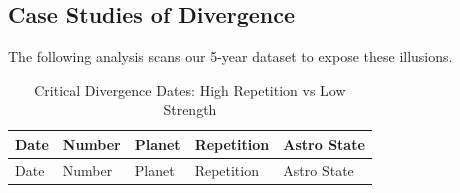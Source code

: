\documentclass[
  american,
  11pt,
  oneside,
  openany]{article}
\begin{document}
\subsection{Case Studies of
Divergence}\label{case-studies-of-divergence}

The following analysis scans our 5-year dataset to expose these
illusions.

\label{divergence-analysis}
\begin{longtable}[]{@{}
  >{\raggedright\arraybackslash}p{}
  >{\raggedleft\arraybackslash}p{}
  >{\raggedright\arraybackslash}p{}
  >{\raggedright\arraybackslash}p{}
  >{\raggedright\arraybackslash}p{}@{}}
\caption{Critical Divergence Dates: High Repetition vs Low
Strength}\tabularnewline
\toprule\noalign{}
\begin{minipage}[b]{\linewidth}\raggedright
Date
\end{minipage} & \begin{minipage}[b]{\linewidth}\raggedleft
Number
\end{minipage} & \begin{minipage}[b]{\linewidth}\raggedright
Planet
\end{minipage} & \begin{minipage}[b]{\linewidth}\raggedright
Repetition
\end{minipage} & \begin{minipage}[b]{\linewidth}\raggedright
Astro State
\end{minipage} \\
\midrule\noalign{}
\endfirsthead
\toprule\noalign{}
\begin{minipage}[b]{\linewidth}\raggedright
Date
\end{minipage} & \begin{minipage}[b]{\linewidth}\raggedleft
Number
\end{minipage} & \begin{minipage}[b]{\linewidth}\raggedright
Planet
\end{minipage} & \begin{minipage}[b]{\linewidth}\raggedright
Repetition
\end{minipage} & \begin{minipage}[b]{\linewidth}\raggedright
Astro State
\end{minipage} \\

\end{longtable}
\end{document}
